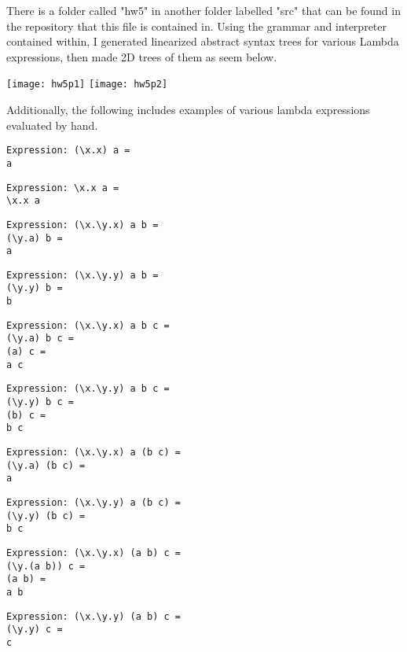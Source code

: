 \documentclass{article}
\theoremstyle{theorem}
\theoremstyle{definition}
\theoremstyle{remark}
\begin{document}
There is a folder called "hw5" in another folder labelled "src" that can be found in the repository that this file is contained in. Using the grammar and interpreter contained within, I generated linearized abstract syntax trees for various Lambda expressions, then made 2D trees of them as seem below.

\begin{center}
\texttt{[image: hw5p1]}
\texttt{[image: hw5p2]}
\end{center}

\medskip\noindent
Additionally, the following includes examples of various lambda expressions evaluated by hand.

\begin{lstlisting}
Expression: (\x.x) a =
a
\end{lstlisting}

\begin{lstlisting}
Expression: \x.x a =
\x.x a
\end{lstlisting}

\begin{lstlisting}
Expression: (\x.\y.x) a b =
(\y.a) b =
a
\end{lstlisting}

\begin{lstlisting}
Expression: (\x.\y.y) a b =
(\y.y) b =
b
\end{lstlisting}

\begin{lstlisting}
Expression: (\x.\y.x) a b c =
(\y.a) b c =
(a) c =
a c
\end{lstlisting}

\begin{lstlisting}
Expression: (\x.\y.y) a b c =
(\y.y) b c =
(b) c =
b c
\end{lstlisting}

\begin{lstlisting}
Expression: (\x.\y.x) a (b c) =
(\y.a) (b c) =
a
\end{lstlisting}

\begin{lstlisting}
Expression: (\x.\y.y) a (b c) =
(\y.y) (b c) =
b c
\end{lstlisting}

\begin{lstlisting}
Expression: (\x.\y.x) (a b) c =
(\y.(a b)) c =
(a b) =
a b
\end{lstlisting}

\begin{lstlisting}
Expression: (\x.\y.y) (a b) c =
(\y.y) c =
c
\end{lstlisting}
\end{document}
